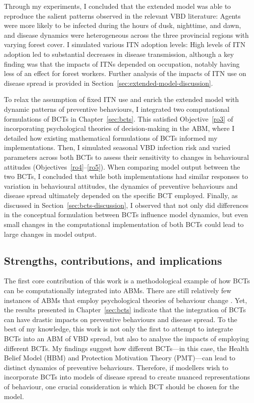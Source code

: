 Through my experiments, I concluded that the extended model was able to reproduce the salient patterns observed in the relevant VBD literature: Agents were more likely to be infected during the hours of dusk, nighttime, and dawn, and disease dynamics were heterogeneous across the three provincial regions with varying forest cover. I simulated various ITN adoption levels: High levels of ITN adoption led to substantial decreases in disease transmission, although a key finding was that the impacts of ITNs depended on occupation, notably having less of an effect for forest workers. Further analysis of the impacts of ITN use on disease spread is provided in Section~\ref{sec:extended-model-discussion}.

To relax the assumption of fixed ITN use and enrich the extended model with dynamic patterns of preventive behaviours, I integrated two computational formulations of BCTs in Chapter~\ref{sec:bcts}. This satisfied Objective~\ref{ro3} of incorporating psychological theories of decision-making in the ABM, where I detailed how existing mathematical formulations of BCTs informed my implementations. Then, I simulated seasonal VBD infection risk and varied parameters across both BCTs to assess their sensitivity to changes in behavioural attitudes (Objectives~\ref{ro4}--\ref{ro5}). When comparing model output between the two BCTs, I concluded that while both implementations had similar responses to variation in behavioural attitudes, the dynamics of preventive behaviours and disease spread ultimately depended on the specific BCT employed. Finally, as discussed in Section~\ref{sec:bcts-discussion}, I observed that not only did differences in the conceptual formulation between BCTs influence model dynamics, but even small changes in the computational implementation of both BCTs could lead to large changes in model output.

\subsection{Strengths, contributions, and implications}

The first core contribution of this work is a methodological example of how BCTs can be computationally integrated into ABMs. There are still relatively few instances of ABMs that employ psychological theories of behaviour change \cite{weston_infection_2018}. Yet, the results presented in Chapter~\ref{sec:bcts} indicate that the integration of BCTs can have drastic impacts on preventive behaviours and disease spread. To the best of my knowledge, this work is not only the first to attempt to integrate BCTs into an ABM of VBD spread, but also to analyse the impacts of employing different BCTs. My findings suggest how different BCTs---in this case, the Health Belief Model (HBM) and Protection Motivation Theory (PMT)---can lead to distinct dynamics of preventive behaviours. Therefore, if modellers wish to incorporate BCTs into models of disease spread to create nuanced representations of behaviour, one crucial consideration is which BCT should be chosen for the model.

